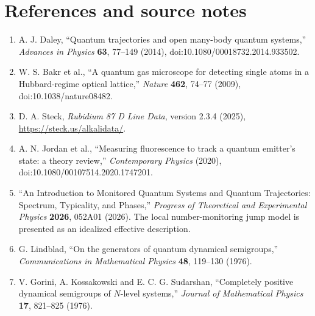 \documentclass[11pt,a4paper]{article}
\begin{document}
\section{References and source notes}
\begin{enumerate}[leftmargin=*]
\item A. J. Daley, ``Quantum trajectories and open many-body quantum systems,'' \emph{Advances in Physics} \textbf{63}, 77--149 (2014), doi:10.1080/00018732.2014.933502.
\item W. S. Bakr et al., ``A quantum gas microscope for detecting single atoms in a Hubbard-regime optical lattice,'' \emph{Nature} \textbf{462}, 74--77 (2009), doi:10.1038/nature08482.
\item D. A. Steck, \emph{Rubidium 87 D Line Data}, version 2.3.4 (2025), \url{https://steck.us/alkalidata/}.
\item A. N. Jordan et al., ``Measuring fluorescence to track a quantum emitter's state: a theory review,'' \emph{Contemporary Physics} (2020), doi:10.1080/00107514.2020.1747201.
\item ``An Introduction to Monitored Quantum Systems and Quantum Trajectories: Spectrum, Typicality, and Phases,'' \emph{Progress of Theoretical and Experimental Physics} \textbf{2026}, 052A01 (2026). The local number-monitoring jump model is presented as an idealized effective description.
\item G. Lindblad, ``On the generators of quantum dynamical semigroups,'' \emph{Communications in Mathematical Physics} \textbf{48}, 119--130 (1976).
\item V. Gorini, A. Kossakowski and E. C. G. Sudarshan, ``Completely positive dynamical semigroups of $N$-level systems,'' \emph{Journal of Mathematical Physics} \textbf{17}, 821--825 (1976).
\end{enumerate}
\end{document}

